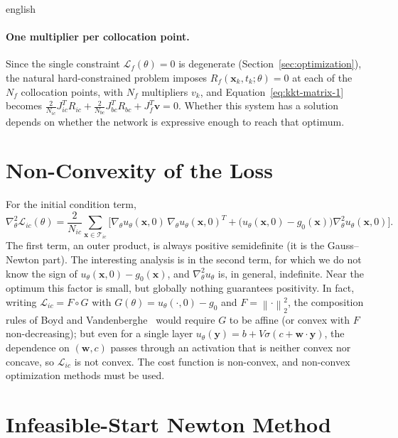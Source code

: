 \documentclass[12pt,letterpaper,twoside]{book}
\newcommand{\norm}[1]{\left\lVert #1 \right\rVert}
\newcommand{\Loss}{\mathcal{L}}
\newcommand{\T}{\mathcal{T}}
\begin{document}
\begin{hyphenrules}{english}
\paragraph{One multiplier per collocation point.}
Since the single constraint $\Loss_f(\theta)=0$ is degenerate (Section~\ref{sec:optimization}), the natural
hard-constrained problem imposes $R_f(\mathbf{x}_k,t_k;\theta)=0$ at each of the $N_f$ collocation points,
with $N_f$ multipliers $v_k$, and Equation~\eqref{eq:kkt-matrix-1} becomes
$\frac{2}{N_{ic}}J_{ic}^{T}R_{ic}+\frac{2}{N_{bc}}J_{bc}^{T}R_{bc}+J_f^{T}\mathbf{v}=0$. Whether this
system has a solution depends on whether the network is expressive enough to reach that optimum.

\section{Non-Convexity of the Loss}\label{app-sec:nonconvexity}

For the initial condition term,
\begin{equation}
  \nabla^2_\theta\Loss_{ic}(\theta)=\frac{2}{N_{ic}}\sum_{\mathbf{x}\in\T_{ic}}
  \Big[\nabla_\theta u_\theta(\mathbf{x},0)\,\nabla_\theta u_\theta(\mathbf{x},0)^{T}
  +\big(u_\theta(\mathbf{x},0)-g_0(\mathbf{x})\big)\nabla^2_\theta u_\theta(\mathbf{x},0)\Big].
  \label{eq:hessian-ic}
\end{equation}
The first term, an outer product, is always positive semidefinite (it is the Gauss--Newton part). The
interesting analysis is in the second term, for which we do not know the sign of
$u_\theta(\mathbf{x},0)-g_0(\mathbf{x})$, and $\nabla^2_\theta u_\theta$ is, in general, indefinite. Near the optimum this
factor is small, but globally nothing guarantees positivity. In fact, writing $\Loss_{ic}=F\circ G$ with
$G(\theta)=u_\theta(\cdot,0)-g_0$ and $F=\norm{\cdot}_2^2$, the composition rules of
Boyd and Vandenberghe~\cite{boyd2004} would require $G$ to be affine (or convex with $F$ non-decreasing); but even for a
single layer $u_\theta(\mathbf{y})=b+V\sigma(c+\mathbf{w}\cdot\mathbf{y})$, the dependence on $(\mathbf{w},c)$ passes
through an activation that is neither convex nor concave, so $\Loss_{ic}$ is not convex. The cost function
is non-convex, and non-convex optimization methods must be used.

\section{Infeasible-Start Newton Method}\label{app-sec:newton}


\end{hyphenrules}
\end{document}
